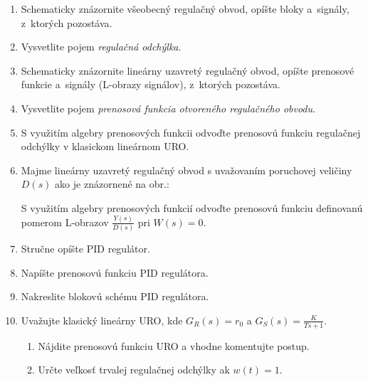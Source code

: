 \documentclass[a4paper, 10pt, ]{article}
\begin{document}
\begin{enumerate}[leftmargin=0pt, labelsep=3mm, itemsep=0pt]


    \item Schematicky znázornite všeobecný regulačný obvod, opíšte bloky a~signály, z~ktorých pozostáva.

    \item Vysvetlite pojem \emph{regulačná odchýlka}.

    \item Schematicky znázornite lineárny uzavretý regulačný obvod, opíšte prenosové funkcie a~signály (L-obrazy signálov), z~ktorých pozostáva.

    \item Vysvetlite pojem \emph{prenosová funkcia otvoreného regulačného obvodu}.

    \item S využitím algebry prenosových funkcii odvoďte prenosovú funkciu regulačnej odchýlky v klasickom lineárnom URO.

    \item Majme lineárny uzavretý regulačný obvod s uvažovaním poruchovej veličiny $D(s)$ ako je znázornené na obr.:

    \noindent

    \noindent
    S využitím algebry prenosových funkcií odvoďte prenosovú funkciu definovanú pomerom L-obrazov $\frac{Y(s)}{D(s)}$ pri $W(s) = 0$.





    \item Stručne opíšte PID regulátor.

    \item Napíšte prenosovú funkciu PID regulátora.

    \item Nakreslite blokovú schému PID regulátora.

    \item Uvažujte klasický lineárny URO, kde $\displaystyle G_R(s) = r_0$ a $\displaystyle G_S(s) = \frac{K}{Ts + 1}$.
    \begin{enumerate}
        \item Nájdite prenosovú funkciu URO a vhodne komentujte postup.
        \item Určte veľkosť trvalej regulačnej odchýlky ak $w(t) = 1$.
    \end{enumerate}


\end{enumerate}
\end{document}
